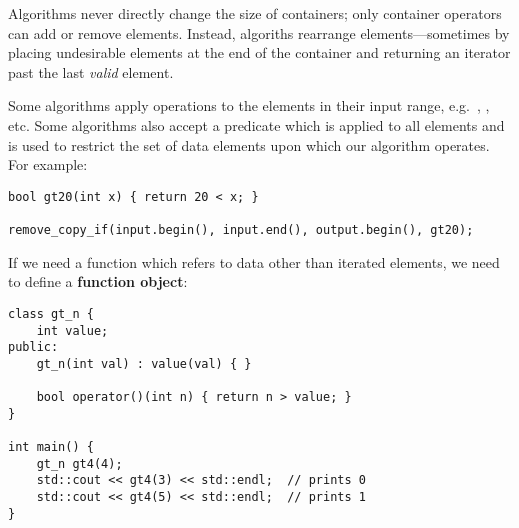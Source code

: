 \documentclass[12pt]{article}
\begin{document}
Algorithms never directly change the size of containers; only container operators can add or remove elements. Instead, algoriths rearrange elements---sometimes by placing undesirable elements at the end of the container and returning an iterator past the last \emph{valid} element.

Some algorithms apply operations to the elements in their input range, e.g.\ , , etc. Some algorithms also accept a predicate which is applied to all elements and is used to restrict the set of data elements upon which our algorithm operates. For example:
\begin{verbatim}
bool gt20(int x) { return 20 < x; }

remove_copy_if(input.begin(), input.end(), output.begin(), gt20);
\end{verbatim}

If we need a function which refers to data other than iterated elements, we need to define a {\bf function object}:
\begin{verbatim}
class gt_n {
    int value;
public:
    gt_n(int val) : value(val) { }

    bool operator()(int n) { return n > value; }
}

int main() {
    gt_n gt4(4);
    std::cout << gt4(3) << std::endl;  // prints 0
    std::cout << gt4(5) << std::endl;  // prints 1
}
\end{verbatim}
\end{document}
